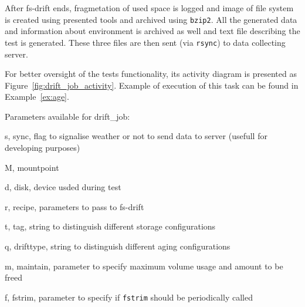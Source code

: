 \documentclass[
  color, %
  table, %
  lof,   %
  lot,   %
]{fithesis3}
\begin{document}
After fs-drift ends, fragmetation of used space is logged and image of file system is created using presented tools and archived using \texttt{bzip2}. All the generated data and information about environment is archived as well and text file describing the test is generated. These three files are then sent (via \texttt{rsync}) to data collecting server.

For better oversight of the tests functionality, its activity diagram is presented as Figure~\ref{fig:drift_job_activity}. Example of execution of this task can be found in Example~\ref{ex:age}. 

Parameters available for drift\_job:
\begin{compactenum}
  \item s, sync, flag to signalise weather or not to send data to server (usefull for developing purposes)
  \item M, mountpoint
  \item d, disk, device usded during test
  \item r, recipe, parameters to pass to fs-drift
  \item t, tag, string to distinguish different storage configurations
  \item q, drifttype, string to distinguish different aging configurations
  \item m, maintain, parameter to specify maximum volume usage and amount to be freed
  \item f, fstrim, parameter to specify if \texttt{fstrim} should be periodically called
  \end{compactenum}
\end{document}
